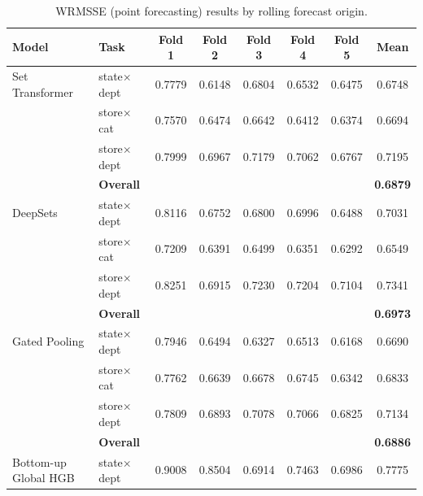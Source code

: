 \begin{table}[H]
  \centering
  \caption{WRMSSE (point forecasting) results by rolling forecast origin.}
  \label{tab:appendix_rolling_folds_point}
  \begin{threeparttable}
    \footnotesize
    \begin{tabular}{llccccc|c}
      \toprule
      \textbf{Model} & \textbf{Task} & \textbf{Fold 1} & \textbf{Fold 2} & \textbf{Fold 3} & \textbf{Fold 4} & \textbf{Fold 5} & \textbf{Mean} \\
      \midrule
      Set Transformer              & state$\times$dept      &   0.7779 &   0.6148 &   0.6804 &   0.6532 &   0.6475 &   0.6748 \\
                                   & store$\times$cat       &   0.7570 &   0.6474 &   0.6642 &   0.6412 &   0.6374 &   0.6694 \\
                                   & store$\times$dept      &   0.7999 &   0.6967 &   0.7179 &   0.7062 &   0.6767 &   0.7195 \\
                                   & {\bf Overall} & & & & & & {\bf 0.6879} \\
      \addlinespace
      DeepSets                     & state$\times$dept      &   0.8116 &   0.6752 &   0.6800 &   0.6996 &   0.6488 &   0.7031 \\
                                   & store$\times$cat       &   0.7209 &   0.6391 &   0.6499 &   0.6351 &   0.6292 &   0.6549 \\
                                   & store$\times$dept      &   0.8251 &   0.6915 &   0.7230 &   0.7204 &   0.7104 &   0.7341 \\
                                   & {\bf Overall} & & & & & & {\bf 0.6973} \\
      \addlinespace
      Gated Pooling                & state$\times$dept      &   0.7946 &   0.6494 &   0.6327 &   0.6513 &   0.6168 &   0.6690 \\
                                   & store$\times$cat       &   0.7762 &   0.6639 &   0.6678 &   0.6745 &   0.6342 &   0.6833 \\
                                   & store$\times$dept      &   0.7809 &   0.6893 &   0.7078 &   0.7066 &   0.6825 &   0.7134 \\
                                   & {\bf Overall} & & & & & & {\bf 0.6886} \\
      \addlinespace
      Bottom-up Global HGB         & state$\times$dept      &   0.9008 &   0.8504 &   0.6914 &   0.7463 &   0.6986 &   0.7775 \\

\end{tabular}
\end{threeparttable}
\end{table}
